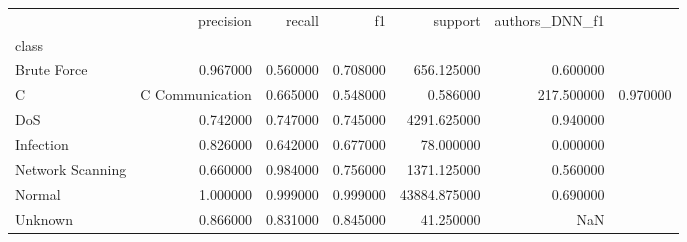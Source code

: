 \begin{tabular}{lrrrrr}
\toprule
 & precision & recall & f1 & support & authors_DNN_f1 \\
class &  &  &  &  &  \\
\midrule
Brute Force & 0.967000 & 0.560000 & 0.708000 & 656.125000 & 0.600000 \\
C&C Communication & 0.665000 & 0.548000 & 0.586000 & 217.500000 & 0.970000 \\
DoS & 0.742000 & 0.747000 & 0.745000 & 4291.625000 & 0.940000 \\
Infection & 0.826000 & 0.642000 & 0.677000 & 78.000000 & 0.000000 \\
Network Scanning & 0.660000 & 0.984000 & 0.756000 & 1371.125000 & 0.560000 \\
Normal & 1.000000 & 0.999000 & 0.999000 & 43884.875000 & 0.690000 \\
Unknown & 0.866000 & 0.831000 & 0.845000 & 41.250000 & NaN \\
\bottomrule
\end{tabular}
